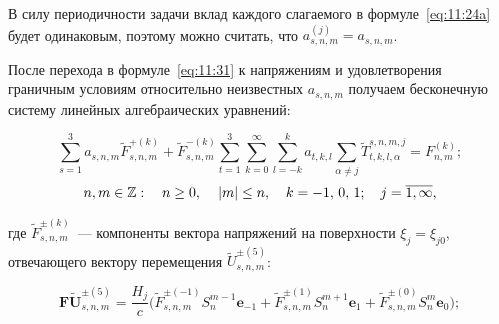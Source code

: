 В силу периодичности задачи вклад каждого слагаемого в формуле~\eqref{eq:11:24a} будет одинаковым, поэтому можно считать, что $a_{s,n,m}^{(j)}=a_{s,n,m}$.

После перехода в формуле~\eqref{eq:11:31} к напряжениям и удовлетворения граничным условиям относительно неизвестных $a_{s,n,m}$ получаем бесконечную систему линейных алгебраических уравнений:

\begin{equation}
\sum\limits_{s=1}^3 a_{s,n,m}\tilde F_{s,n,m}^{+(k)}+\tilde F_{s,n,m}^{-(k)}\sum\limits_{t=1}^3\sum\limits_{k=0}^\infty\sum\limits_{l=-k}^k a_{t,k,l}\sum\limits_{\alpha\neq j}\tilde T_{t,k,l,\alpha}^{s,n,m,j}=F_{n,m}^{(k)};
\label{eq:11:sys}
\end{equation}
$$
n,m \in\mathbb{Z}:\quad n \ge 0,{\mkern 1mu} \quad {\kern 1pt} |m| \le n,\quad {\mkern 1mu} k =  - 1,{\mkern 1mu} {\kern 1pt} 0,{\mkern 1mu} {\kern 1pt} 1;\;\;\;{\mkern 1mu} {\kern 1pt} j = \overline {1,\infty},
$$

\noindent где $\tilde F_{s,n,m}^{\pm(k)}$~--- компоненты вектора напряжений на поверхности $\xi_j=\xi_{j0}$, отвечающего вектору перемещения $\tilde U_{s,n,m}^{\pm(5)}$:

$$
\mathbf{F\tilde U}_{s,n,m}^{\pm(5)}=\frac{H_j}{c}\bigg(\tilde F_{s,n,m}^{\pm(-1)}S_n^{m-1}\mathbf{e}_{-1}+\tilde F_{s,n,m}^{\pm(1)}S_n^{m+1}\mathbf{e}_1+\tilde F_{s,n,m}^{\pm(0)}S_n^m\mathbf{e}_0\bigg);
$$

